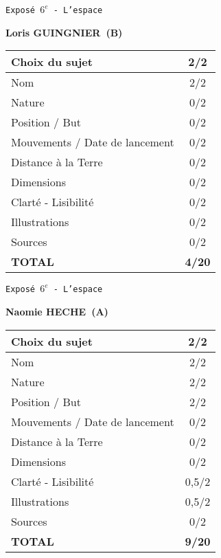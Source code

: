 	\vspace*{1cm}
	
	\newpage
	\LARGE{\texttt{Expos\'e $6^e$ - L'espace}}
	\vspace*{1cm}

	\textbf{Loris GUINGNIER\ (B)}

	\vspace*{1.5cm}
	\begin{tabular}{|l|c|}
		\hline
		Choix du sujet & 2/2 \\
		\hline
		Nom & 2/2 \\
		\hline
		Nature & 0/2 \\
		\hline
		Position / But & 0/2 \\
		\hline
		Mouvements / Date de lancement & 0/2 \\
		\hline
		Distance \`a la Terre & 0/2 \\
		\hline
		Dimensions & 0/2 \\
		\hline
		Clart\'e - Lisibilit\'e & 0/2 \\
		\hline
		Illustrations & 0/2 \\
		\hline
		Sources & 0/2 \\
		\hline
		\textbf{TOTAL}  & \textbf{4/20} \\
		\hline
	\end{tabular}

	\vspace*{1cm}
	
	\newpage
	\LARGE{\texttt{Expos\'e $6^e$ - L'espace}}
	\vspace*{1cm}

	\textbf{Naomie HECHE\ (A)}

	\vspace*{1.5cm}
	\begin{tabular}{|l|c|}
		\hline
		Choix du sujet & 2/2 \\
		\hline
		Nom & 2/2 \\
		\hline
		Nature & 2/2 \\
		\hline
		Position / But & 2/2 \\
		\hline
		Mouvements / Date de lancement & 0/2 \\
		\hline
		Distance \`a la Terre & 0/2 \\
		\hline
		Dimensions & 0/2 \\
		\hline
		Clart\'e - Lisibilit\'e & 0,5/2 \\
		\hline
		Illustrations & 0,5/2 \\
		\hline
		Sources & 0/2 \\
		\hline
		\textbf{TOTAL}  & \textbf{9/20} \\
		\hline
	\end{tabular}

